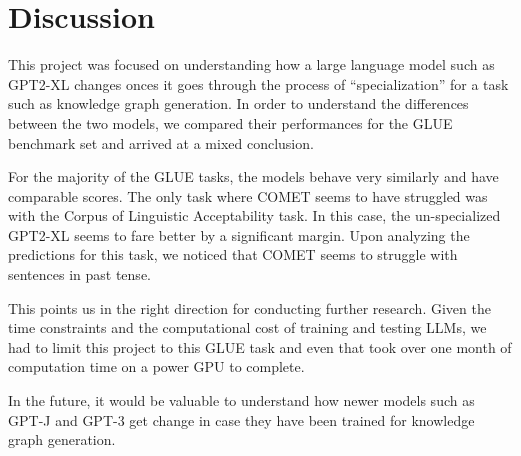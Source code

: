 \documentclass[\main/thesis.tex]{subfiles}
\begin{document}
\chapter{Discussion}

This project was focused on understanding how a large language model such as GPT2-XL changes onces it goes through
the process of ``specialization'' for a task such as knowledge graph generation. In order to understand the differences 
between the two models, we compared their performances for the GLUE benchmark set and arrived at a mixed conclusion. 

For the majority of the GLUE tasks, the models behave very similarly and have comparable scores. The only task where 
COMET seems to have struggled was with the Corpus of Linguistic Acceptability task. In this case, the un-specialized 
GPT2-XL seems to fare better by a significant margin. Upon analyzing the predictions for this task, we noticed that 
COMET seems to struggle with sentences in past tense. 

This points us in the right direction for conducting further research. Given the time constraints and the 
computational cost of training and testing LLMs, we had to limit this project to this GLUE task and even that took 
over one month of computation time on a power GPU to complete. 

In the future, it would be valuable to understand how newer models such as GPT-J and GPT-3 get change in case
they have been trained for knowledge graph generation. 
\end{document}
